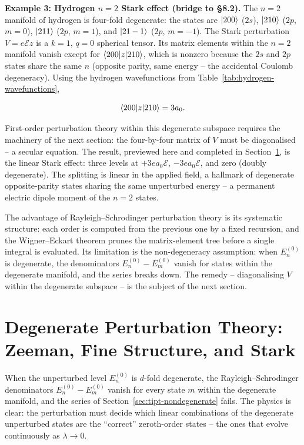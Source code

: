 \medskip\noindent\textbf{Example 3: Hydrogen $n=2$ Stark effect (bridge to \S 8.2).}
The $n=2$ manifold of hydrogen is four-fold degenerate: the states are $\ket{200}$ ($2s$), $\ket{210}$ ($2p$, $m=0$), $\ket{211}$ ($2p$, $m=1$), and $\ket{21-1}$ ($2p$, $m=-1$). The Stark perturbation $V = e\mathcal{E}z$ is a $k=1$, $q=0$ spherical tensor. Its matrix elements within the $n=2$ manifold vanish except for $\braket{200|z|210}$, which is nonzero because the $2s$ and $2p$ states share the same $n$ (opposite parity, same energy -- the accidental Coulomb degeneracy). Using the hydrogen wavefunctions from Table~\ref{tab:hydrogen-wavefunctions},
\begin{linenomath}
\begin{equation*}
\braket{200|z|210} = 3a_{0}.
\end{equation*}
\end{linenomath}
First-order perturbation theory within this degenerate subspace requires the machinery of the next section: the four-by-four matrix of $V$ must be diagonalised -- a secular equation. The result, previewed here and completed in Section~\ref{sec:degenerate-perturbation}, is the linear Stark effect: three levels at $+3ea_{0}\mathcal{E}$, $-3ea_{0}\mathcal{E}$, and zero (doubly degenerate). The splitting is linear in the applied field, a hallmark of degenerate opposite-parity states sharing the same unperturbed energy -- a permanent electric dipole moment of the $n=2$ states.

The advantage of Rayleigh--Schrodinger perturbation theory is its systematic structure: each order is computed from the previous one by a fixed recursion, and the Wigner--Eckart theorem prunes the matrix-element tree before a single integral is evaluated. Its limitation is the non-degeneracy assumption: when $E_{n}^{(0)}$ is degenerate, the denominators $E_{n}^{(0)}-E_{m}^{(0)}$ vanish for states within the degenerate manifold, and the series breaks down. The remedy -- diagonalising $V$ within the degenerate subspace -- is the subject of the next section.

\section{Degenerate Perturbation Theory: Zeeman, Fine Structure, and Stark}
\label{sec:degenerate-perturbation}

When the unperturbed level $E_{n}^{(0)}$ is $d$-fold degenerate, the Rayleigh--Schrodinger denominators $E_{n}^{(0)}-E_{m}^{(0)}$ vanish for every state $m$ within the degenerate manifold, and the series of Section~\ref{sec:tipt-nondegenerate} fails. The physics is clear: the perturbation must decide which linear combinations of the degenerate unperturbed states are the ``correct'' zeroth-order states -- the ones that evolve continuously as $\lambda \to 0$.


